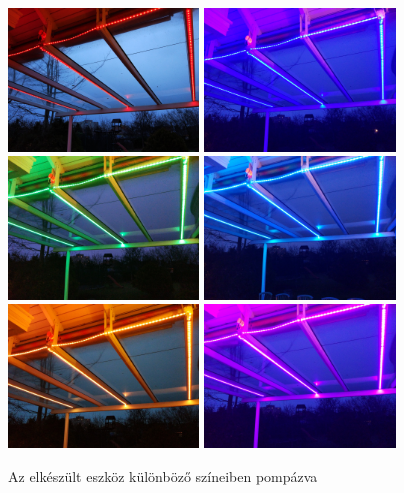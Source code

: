 \documentclass[../main.tex]{subfiles}
\begin{document}
        \begin{figure}[h!]
            \centering
                \includegraphics[height=3.8cm]{resources/alk_res/1_red}
                \includegraphics[height=3.8cm]{resources/alk_res/2_purpule_blue}
                \includegraphics[height=3.8cm]{resources/alk_res/3_green}
                \includegraphics[height=3.8cm]{resources/alk_res/6_light_blue}
                \includegraphics[height=3.8cm]{resources/alk_res/4_orange}
                \includegraphics[height=3.8cm]{resources/alk_res/5_pink}
            \caption{Az elkészült eszköz különböző színeiben pompázva}
            \label{fig:pic_terasz}
        \end{figure}
\end{document}
